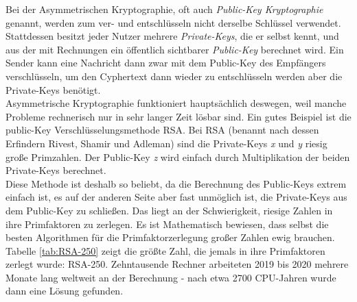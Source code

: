 \documentclass[12pt]{article}
\begin{document}
Bei der Asymmetrischen Kryptographie, oft auch \textit{Public-Key Kryptographie} genannt, werden zum ver- und entschlüsseln nicht derselbe Schlüssel verwendet. Stattdessen besitzt jeder Nutzer mehrere \textit{Private-Keys}, die er selbst kennt, und aus der mit Rechnungen ein öffentlich sichtbarer \textit{Public-Key} berechnet wird. Ein Sender kann eine Nachricht dann zwar mit dem Public-Key des Empfängers verschlüsseln, um den Cyphertext dann wieder zu entschlüsseln werden aber die Private-Keys benötigt. \cite{mavroeidis2018impact} \\

Asymmetrische Kryptographie funktioniert hauptsächlich deswegen, weil manche Probleme rechnerisch nur in sehr langer Zeit lösbar sind. Ein gutes Beispiel ist die public-Key Verschlüsselungsmethode RSA. Bei RSA (benannt nach dessen Erfindern Rivest, Shamir und Adleman) sind die Private-Keys \textit{x} und \textit{y} riesig große Primzahlen. Der Public-Key \textit{z} wird einfach durch Multiplikation der beiden Private-Keys berechnet. \cite{mavroeidis2018impact} \\

Diese Methode ist deshalb so beliebt, da die Berechnung des Public-Keys extrem einfach ist, es auf der anderen Seite aber fast unmöglich ist, die Private-Keys aus dem Public-Key zu schließen. Das liegt an der Schwierigkeit, riesige Zahlen in ihre Primfaktoren zu zerlegen. Es ist Mathematisch bewiesen, dass selbst die besten Algorithmen für die Primfaktorzerlegung großer Zahlen ewig brauchen. \\

Tabelle \ref{tab:RSA-250} zeigt die größte Zahl, die jemals in ihre Primfaktoren zerlegt wurde: RSA-250. Zehntausende Rechner arbeiteten 2019 bis 2020 mehrere Monate lang weltweit an der Berechnung - nach etwa 2700 CPU-Jahren wurde dann eine Lösung gefunden. \cite{RSA250} \cite{RSANumbers}
\end{document}
